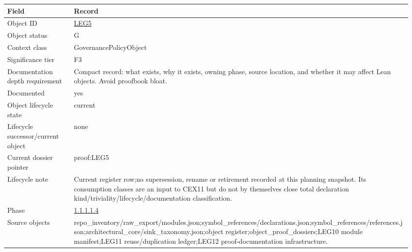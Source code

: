 \begin{longtable}{L{0.16\linewidth} L{0.81\linewidth}}
\hline
\textbf{Field} & \textbf{Record}\\
\hline
Object ID & \hyperlink{object-row-LEG5}{LEG5}\\
\hline\addlinespace[0.20em]
Object status & G\\
\hline\addlinespace[0.20em]
Context class & GovernancePolicyObject\\
\hline\addlinespace[0.20em]
Significance tier & F3\\
\hline\addlinespace[0.20em]
Documentation depth requirement & Compact record: what exists, why it exists, owning phase, source location, and whether it may affect Lean objects. Avoid proofbook bloat.\\
\hline\addlinespace[0.20em]
Documented & yes\\
\hline\addlinespace[0.20em]
Object lifecycle state & current\\
\hline\addlinespace[0.20em]
Lifecycle successor/\allowbreak{}current object & none\\
\hline\addlinespace[0.20em]
Current dossier pointer & proof:LEG5\\
\hline\addlinespace[0.20em]
Lifecycle note & Current register row;\newline no supersession, rename or retirement recorded at this planning snapshot. Its consumption classes are an input to CEX11 but do not by themselves close total declaration kind/\allowbreak{}triviality/\allowbreak{}lifecycle/\allowbreak{}documentation classification.\\
\hline\addlinespace[0.20em]
Phase & \hyperlink{phase-row-1-1-1-1-4}{1.1.1.1.4}\\
\hline\addlinespace[0.20em]
Source objects & repo\_inventory/\allowbreak{}raw\_export/\allowbreak{}modules.json;\newline symbol\_references/\allowbreak{}declarations.json;\newline symbol\_references/\allowbreak{}references.json;\newline architectural\_core/\allowbreak{}sink\_taxonomy.json;\newline object register;\newline object\_proof\_dossiers;\newline LEG10 module manifest;\newline LEG11 reuse/\allowbreak{}duplication ledger;\newline LEG12 proof-documentation infrastructure.\\

\end{longtable}
